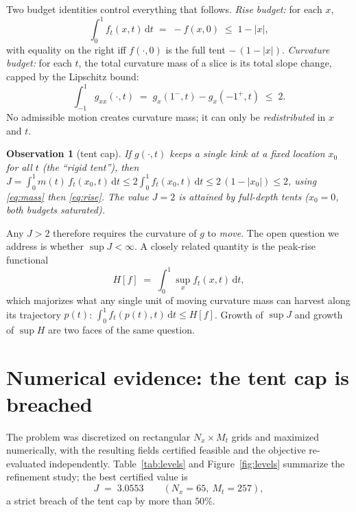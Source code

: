 \documentclass[11pt]{article}
\newtheorem{observation}{Observation}
\newcommand{\dd}{\,\mathrm{d}}
\begin{document}
Two budget identities control everything that follows.
\emph{Rise budget:} for each $x$,
\begin{equation}
\label{eq:rise}
\int_0^1 f_t(x,t)\dd t \;=\; -f(x,0)\;\le\; 1-|x|,
\end{equation}
with equality on the right iff $f(\cdot,0)$ is the full tent
$-\,(1-|x|)$. \emph{Curvature budget:} for each $t$, the total curvature
mass of a slice is its total slope change, capped by the Lipschitz bound:
\begin{equation}
\label{eq:mass}
\int_{-1}^{1} g_{xx}(\cdot,t)\;=\;g_x(1^-,t)-g_x(-1^+,t)\;\le\;2 .
\end{equation}
No admissible motion creates curvature mass; it can only be
\emph{redistributed} in $x$ and $t$.

\begin{observation}[tent cap]
\label{obs:tent}
If $g(\cdot,t)$ keeps a single kink at a fixed location $x_0$ for all $t$
(the ``rigid tent''), then
$J=\int_0^1 m(t)\,f_t(x_0,t)\dd t \le 2\int_0^1 f_t(x_0,t)\dd t
\le 2\,(1-|x_0|)\le 2$, using \eqref{eq:mass} then \eqref{eq:rise}. The value
$J=2$ is attained by full-depth tents ($x_0=0$, both budgets saturated).
\end{observation}

Any $J>2$ therefore requires the curvature of $g$ to \emph{move}. The open
question we address is whether $\sup J<\infty$. A closely related quantity
is the peak-rise functional
\begin{equation}
\label{eq:H}
H[f]\;=\;\int_0^1 \sup_x f_t(x,t)\dd t ,
\end{equation}
which majorizes what any single unit of moving curvature mass can harvest
along its trajectory $p(t)$:
$\int_0^1 f_t(p(t),t)\dd t\le H[f]$. Growth of $\sup J$ and growth of
$\sup H$ are two faces of the same question.

\section{Numerical evidence: the tent cap is breached}

The problem was discretized on rectangular $N_x\times M_t$ grids and
maximized numerically, with the resulting fields certified feasible and the
objective re-evaluated independently. Table~\ref{tab:levels} and
Figure~\ref{fig:levels} summarize the refinement study; the best certified
value is
\[
J \;=\; 3.0553 \qquad (N_x=65,\ M_t=257),
\]
a strict breach of the tent cap by more than $50\%$.
\end{document}
